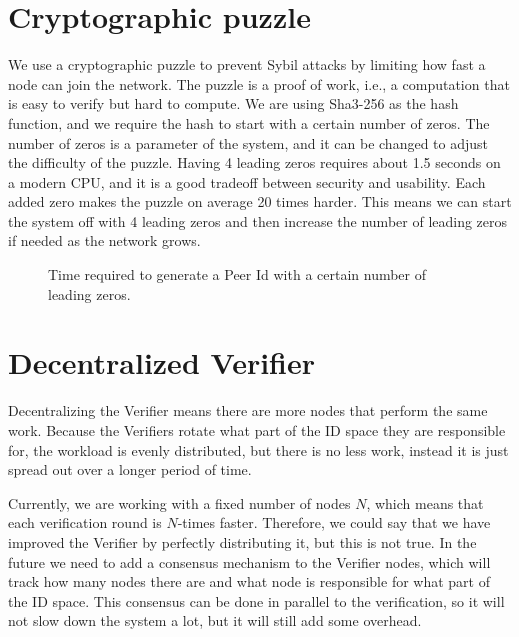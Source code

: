 \section{Cryptographic puzzle}

We use a cryptographic puzzle to prevent Sybil attacks by limiting how fast a node can join the network.
The puzzle is a proof of work, i.e., a computation that is easy to verify but hard to compute.
We are using Sha3-256 \cite{sha3} as the hash function, and we require the hash to start with a certain number of zeros.
The number of zeros is a parameter of the system, and it can be changed to adjust the difficulty of the puzzle.
Having 4 leading zeros requires about 1.5 seconds on a modern CPU, and it is a good tradeoff between security and usability.
Each added zero makes the puzzle on average 20 times harder.
This means we can start the system off with 4 leading zeros and then increase the number of leading zeros if needed as the network grows.

\begin{figure}
  \myfloatalign
  \caption[]{Time required to generate a Peer Id with a certain number of leading zeros.}
  \label{fig:pretty-graph}
\end{figure}

\section{Decentralized Verifier}

Decentralizing the Verifier means there are more nodes that perform the same work.
Because the Verifiers rotate what part of the ID space they are responsible for, the workload is evenly distributed,
but there is no less work, instead it is just spread out over a longer period of time.

Currently, we are working with a fixed number of nodes $N$, which means that each verification round is $N$-times faster.
Therefore, we could say that we have improved the Verifier by perfectly distributing it, but this is not true.
In the future we need to add a consensus mechanism to the Verifier nodes, which will track how many nodes there are and what node is responsible for what part of the ID space.
This consensus can be done in parallel to the verification, so it will not slow down the system a lot,
but it will still add some overhead.

